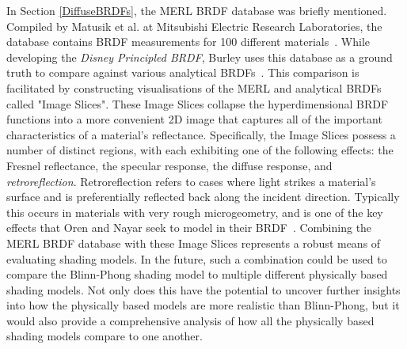 In Section \ref{DiffuseBRDFs}, the MERL BRDF database was briefly mentioned. Compiled by Matusik et al. at Mitsubishi Electric Research Laboratories, the database contains BRDF measurements for 100 different materials~\cite{MERL}. While developing the \textit{Disney Principled BRDF}, Burley uses this database as a ground truth to compare against various analytical BRDFs~\cite{Burley2012Physically}. This comparison is facilitated by constructing visualisations of the MERL and analytical BRDFs called "Image Slices". These Image Slices collapse the hyperdimensional BRDF functions into a more convenient 2D image that captures all of the important characteristics of a material's reflectance. Specifically, the Image Slices possess a number of distinct regions, with each exhibiting one of the following effects: the Fresnel reflectance, the specular response, the diffuse response, and \textit{retroreflection}. Retroreflection refers to cases where light strikes a material's surface and is preferentially reflected back along the incident direction. Typically this occurs in materials with very rough microgeometry, and is one of the key effects that Oren and Nayar seek to model in their BRDF~\cite{OrenAndNayar}. Combining the MERL BRDF database with these Image Slices represents a robust means of evaluating shading models. In the future, such a combination could be used to compare the Blinn-Phong shading model to multiple different physically based shading models. Not only does this have the potential to uncover further insights into how the physically based models are more realistic than Blinn-Phong, but it would also provide a comprehensive analysis of how all the physically based shading models compare to one another.

